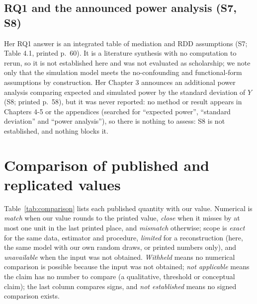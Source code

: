 \subsection{RQ1 and the announced power analysis (S7, S8)}\label{sec:s7s8}

Her RQ1 answer is an integrated table of mediation and RDD assumptions (S7; Table 4.1, printed p.~60). It is a literature synthesis with no computation to rerun, so it is not established here and was not evaluated as scholarship; we note only that the simulation model meets the no-confounding and functional-form assumptions by construction. Her Chapter 3 announces an additional power analysis comparing expected and simulated power by the standard deviation of $Y$ (S8; printed p.~58), but it was never reported: no method or result appears in Chapters 4-5 or the appendices (searched for ``expected power'', ``standard deviation'' and ``power analysis''), so there is nothing to assess: S8 is not established, and nothing blocks it.

\section{Comparison of published and replicated values}\label{sec:comparison}

Table~\ref{tab:comparison} lists each published quantity with our value. Numerical is \emph{match} when our value rounds to the printed value, \emph{close} when it misses by at most one unit in the last printed place, and \emph{mismatch} otherwise; scope is \emph{exact} for the same data, estimator and procedure, \emph{limited} for a reconstruction (here, the same model with our own random draws, or printed numbers only), and \emph{unavailable} when the input was not obtained. \emph{Withheld} means no numerical comparison is possible because the input was not obtained; \emph{not applicable} means the claim has no number to compare (a qualitative, threshold or conceptual claim); the last column compares signs, and \emph{not established} means no signed comparison exists.

